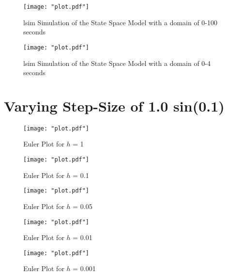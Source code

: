 \documentclass[12pt]{article}
\begin{document}
		\begin{figure}[H]
			\centering
			\texttt{[image: "plot.pdf"]}
			\caption{lsim Simulation of the State Space Model with a domain of 0-100 seconds}
			\label{fig:lsimrun100s}
		\end{figure}
		\begin{figure}[H]
			\centering
			\texttt{[image: "plot.pdf"]}
			\caption{lsim Simulation of the State Space Model with a domain of 0-4 seconds}
			\label{fig:lsimrun4s}
		\end{figure}

	\section{Varying Step-Size of 1.0 sin(0.1)}
		
		
		
		
		
		\begin{figure}[H]
			\centering
			\texttt{[image: "plot.pdf"]}
			\caption{Euler Plot for $h$ = 1}
			\label{fig:eulerploth1}
		\end{figure}	
		\begin{figure}[H]
			\centering
			\texttt{[image: "plot.pdf"]}
			\caption{Euler Plot for $h$ = 0.1}
			\label{fig:eulerploth01}
		\end{figure}
		\begin{figure}[H]
			\centering
			\texttt{[image: "plot.pdf"]}
			\caption{Euler Plot for $h$ = 0.05}
			\label{fig:eulerploth005}
		\end{figure}
		
		\begin{figure}[H]
			\centering
			\texttt{[image: "plot.pdf"]}
			\caption{Euler Plot for $h$ = 0.01}
			\label{fig:eulerploth001}
		\end{figure}
		\begin{figure}[H]
			\centering
			\texttt{[image: "plot.pdf"]}
			\caption{Euler Plot for $h$ = 0.001}
			\label{fig:eulerploth0001}
		\end{figure}
	
\end{document}
